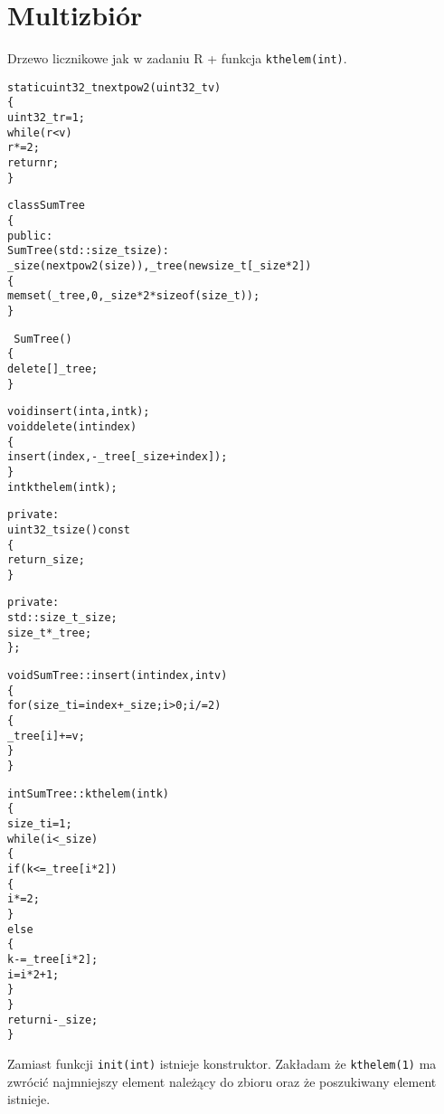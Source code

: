 \documentclass[a4paper,12pt]{article}
\begin{document}
\section{Multizbiór}
Drzewo licznikowe jak w zadaniu R + funkcja \verb|kthelem(int)|.
\begin{alltt}
static uint32_t nextpow2(uint32_t v)
\{
    uint32_t r = 1;
    while(r < v)
        r *= 2;
    return r;
\}

class SumTree
\{
public:
    SumTree(std::size_t size) :
        _size(nextpow2(size)), _tree(new size_t[_size * 2])
    \{
        memset(_tree,0,_size*2*sizeof(size_t));
    \}

    ~SumTree()
    \{
        delete [] _tree;
    \}
    
    void insert(int a, int k);
    void delete(int index)
    \{
        insert(index,-_tree[_size+index]);
    \}
    int kthelem(int k);

private:
    uint32_t size() const
    \{
        return _size;
    \}

private:
    std::size_t _size;
    size_t *_tree;
\};

void SumTree::insert(int index, int v)
\{
    for(size_t i = index + _size; i > 0; i /= 2)
    \{
        _tree[i] += v;
    \}
\}

int SumTree::kthelem(int k)
\{
    size_t i=1;
    while(i<_size)
    \{
        if(k<=_tree[i*2])
        \{
            i*=2;
        \}
        else
        \{
            k-=_tree[i*2];
            i=i*2+1;
        \}
    \}
    return i-_size;
\}
\end{alltt}
Zamiast funkcji \verb|init(int)| istnieje konstruktor. Zakładam że \verb|kthelem(1)| ma zwrócić najmniejszy element należący do zbioru oraz że poszukiwany element istnieje.
\end{document}
